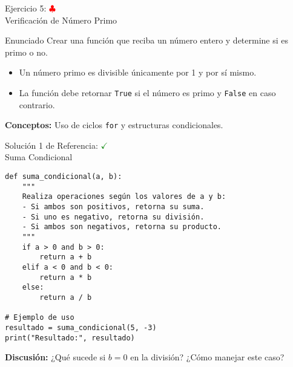 \documentclass[10pt]{beamer}
\begin{document}
\begin{frame}{Ejercicio 5: \hfill \textcolor{red}{$\clubsuit$} \\ 
Verificación de Número Primo}
  \begin{block}{Enunciado}
    Crear una función que reciba un número entero y determine si es primo o no.
    \begin{itemize}
      \item Un número primo es divisible únicamente por 1 y por sí mismo.
      \item La función debe retornar \texttt{True} si el número es primo y \texttt{False} en caso contrario.
    \end{itemize}
  \end{block}
  \textbf{Conceptos:} Uso de ciclos \texttt{for} y estructuras condicionales.
\end{frame}


\begin{frame}[fragile]{Solución 1 de Referencia: \hfill \textcolor{green}{$\checkmark$} \\ 
Suma Condicional}
\begin{verbatim}
def suma_condicional(a, b):
    """
    Realiza operaciones según los valores de a y b:
    - Si ambos son positivos, retorna su suma.
    - Si uno es negativo, retorna su división.
    - Si ambos son negativos, retorna su producto.
    """
    if a > 0 and b > 0:
        return a + b
    elif a < 0 and b < 0:
        return a * b
    else:
        return a / b

# Ejemplo de uso
resultado = suma_condicional(5, -3)
print("Resultado:", resultado)
\end{verbatim}
\textbf{Discusión:} ¿Qué sucede si \( b = 0 \) en la división? ¿Cómo manejar este caso?
\end{frame}
\end{document}
